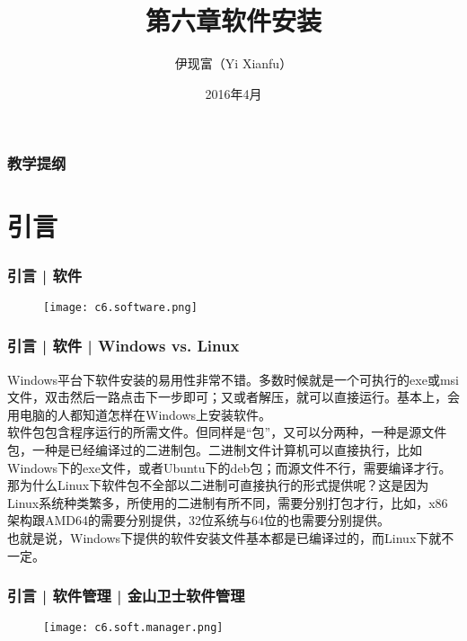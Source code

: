 



\title[软件安装]{第六章\quad 软件安装}
\author[Yixf]{伊现富（Yi Xianfu）}
\date{2016年4月}


\begin{frame}
  \titlepage
\end{frame}

\begin{frame}[plain,label=current]
  \frametitle{教学提纲}
  \setcounter{tocdepth}{3}
  \begin{multicols}{2}
    \tableofcontents
  \end{multicols}
\end{frame}


\section{引言}
\begin{frame}
  \frametitle{引言 | 软件}
  \begin{figure}
    \centering
    \texttt{[image: c6.software.png]}
  \end{figure}
\end{frame}

\begin{frame}
  \frametitle{引言 | 软件 | Windows vs. Linux}
  Windows平台下软件安装的易用性非常不错。多数时候就是一个可执行的exe或msi文件，双击然后一路点击下一步即可；又或者解压，就可以直接运行。基本上，会用电脑的人都知道怎样在Windows上安装软件。\\
  \vspace{5pt}
  软件包包含程序运行的所需文件。但同样是“包”，又可以分两种，一种是源文件包，一种是已经编译过的二进制包。二进制文件计算机可以直接执行，比如Windows下的exe文件，或者Ubuntu下的deb包；而源文件不行，需要编译才行。那为什么Linux下软件包不全部以二进制可直接执行的形式提供呢？这是因为Linux系统种类繁多，所使用的二进制有所不同，需要分别打包才行，比如，x86架构跟AMD64的需要分别提供，32位系统与64位的也需要分别提供。\\
  \vspace{5pt}
  也就是说，Windows下提供的软件安装文件基本都是已编译过的，而Linux下就不一定。
\end{frame}

\begin{frame}
  \frametitle{引言 | 软件管理 | 金山卫士软件管理}
  \begin{figure}
    \centering
    \texttt{[image: c6.soft.manager.png]}
  \end{figure}
\end{frame}

